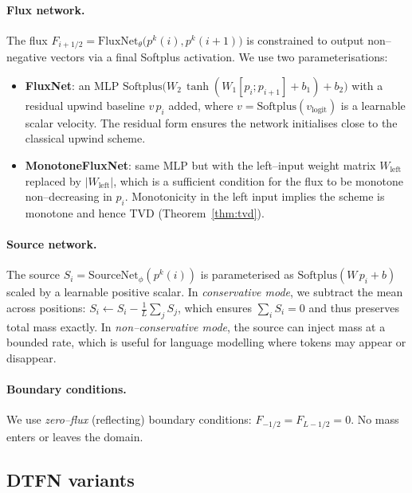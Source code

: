 \documentclass[10pt]{article}
\theoremstyle{definition}
\theoremstyle{remark}
\newcommand{\FluxNet}{\mathrm{FluxNet}}
\newcommand{\SourceNet}{\mathrm{SourceNet}}
\begin{document}
\paragraph{Flux network.}
The flux $F_{i+1/2}= \FluxNet_\theta\bigl(p^k(i), p^k(i+1)\bigr)$ is
constrained to output non--negative vectors via a final Softplus
activation.  We use two parameterisations:
\begin{itemize}[leftmargin=*,itemsep=2pt]
  \item \textbf{FluxNet}: an MLP
        $\mathrm{Softplus}\bigl(W_2\,\tanh(W_1[p_i;p_{i+1}]+b_1)+b_2\bigr)$
        with a residual upwind baseline $v\,p_i$ added, where
        $v=\mathrm{Softplus}(v_\text{logit})$ is a learnable scalar
        velocity.  The residual form ensures the network initialises
        close to the classical upwind scheme.
  \item \textbf{MonotoneFluxNet}: same MLP but with the
        left--input weight matrix $W_\text{left}$ replaced by
        $|W_\text{left}|$, which is a sufficient condition for the
        flux to be monotone non--decreasing in $p_i$.  Monotonicity in
        the left input implies the scheme is monotone and hence TVD
        (Theorem~\ref{thm:tvd}).
\end{itemize}

\paragraph{Source network.}
The source $S_i = \SourceNet_\phi(p^k(i))$ is parameterised as
$\mathrm{Softplus}(W\,p_i + b)$ scaled by a learnable positive scalar.
In \emph{conservative mode}, we subtract the mean across positions:
$S_i \leftarrow S_i - \tfrac{1}{L}\sum_j S_j$, which ensures
$\sum_i S_i = 0$ and thus preserves total mass exactly.  In
\emph{non--conservative mode}, the source can inject mass at a
bounded rate, which is useful for language modelling where tokens may
appear or disappear.

\paragraph{Boundary conditions.}
We use \emph{zero--flux} (reflecting) boundary conditions:
$F_{-1/2} = F_{L-1/2} = 0$.  No mass enters or leaves the domain.

\subsection{DTFN variants}
\end{document}
